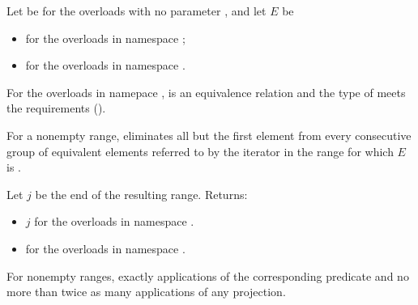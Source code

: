 \begin{itemdescr}
\pnum
Let  be 
for the overloads with no parameter , and
let $E$ be
\begin{itemize}
\setlength{\emergencystretch}{1em}
\item
  for the overloads in namespace ;
\item
  for the overloads in namespace .
\end{itemize}

\pnum
\expects
For the overloads in namepace ,
 is an equivalence relation and
the type of  meets
the  requirements ().

\pnum
\effects
For a nonempty range, eliminates all but the first element
from every consecutive group of equivalent elements referred to
by the iterator  in the range 
for which $E$ is .

\pnum
\returns
Let $j$ be the end of the resulting range. Returns:
\begin{itemize}
\item $j$ for the overloads in namespace .
\item {} for the overloads in namespace .
\end{itemize}

\pnum
\complexity
For nonempty ranges, exactly  applications
of the corresponding predicate and
no more than twice as many applications of any projection.
\end{itemdescr}

